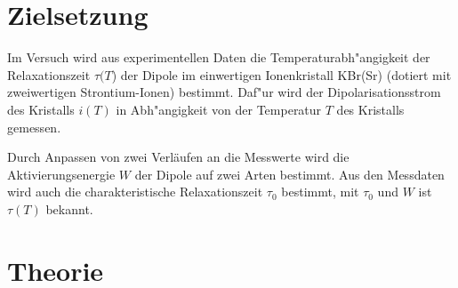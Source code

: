 \section{Zielsetzung}
  \label{sec:Zielsetzung}
  Im Versuch wird aus experimentellen Daten die Temperaturabh"angigkeit der Relaxationszeit $\tau(T$) der Dipole im einwertigen Ionenkristall KBr(Sr) (dotiert mit zweiwertigen Strontium-Ionen) bestimmt.
  Daf"ur wird der Dipolarisationsstrom des Kristalls $i(T)$ in Abh"angigkeit von der Temperatur $T$ des Kristalls gemessen.

  Durch Anpassen von zwei Verläufen an die Messwerte wird die Aktivierungsenergie $W$ der Dipole auf zwei Arten bestimmt.
  Aus den Messdaten wird auch die charakteristische Relaxationszeit $\tau_0$ bestimmt, mit $\tau_0$ und $W$ ist $\tau(T)$ bekannt.





\section{Theorie}
  \label{sec:Theorie}

